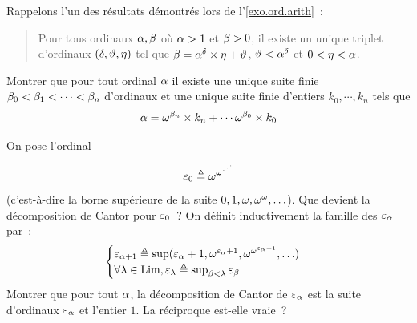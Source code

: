 \begin{exercise}
  Rappelons l'un des résultats démontrés lors de l'\cref{exo.ord.arith}~:
  \begin{quotation}
    \noindent
    Pour tous ordinaux $\alpha,\beta$ où $\alpha > 1$ et $\beta > 0$, il
    existe un unique triplet d'ordinaux $(\delta,\vartheta,\eta)$ tel que
    $\beta = \alpha^{\delta}\times\eta + \vartheta$, $\vartheta < \alpha^{\delta}$
    et $0 < \eta < \alpha$.
  \end{quotation}
  Montrer que pour tout ordinal $\alpha$ il existe une unique suite finie
  $\beta_0 < \beta_1 < \cdots < \beta_n$ d'ordinaux et une unique suite
  finie d'entiers $k_0, \cdots, k_n$ tels que
  \[\alpha = \omega^{\beta_n} \times k_n + \cdots \omega^{\beta_0} \times k_0\]

  On pose l'ordinal
  \[\varepsilon_{0} \triangleq \omega^{\omega^{\iddots}}\]
  (c'est-à-dire la borne supérieure de la suite $0,1,\omega,\omega^\omega,\ldots$). Que
  devient la décomposition de Cantor pour $\varepsilon_{0}$~? On définit inductivement la
  famille des $\varepsilon_{\alpha}$ par~:
  \[\begin{cases}
  \varepsilon_{\alpha+1} \triangleq \sup(\varepsilon_{\alpha} + 1, \omega^{\varepsilon_{\alpha} + 1},
  \omega^{\omega^{\varepsilon_{\alpha} + 1}},\ldots)\\
  \forall \lambda \in \operatorname{Lim}, \varepsilon_{\lambda} \triangleq \sup_{\beta < \lambda} \varepsilon_{\beta}
  \end{cases}\]
  Montrer que pour tout $\alpha$, la décomposition de Cantor de $\varepsilon_{\alpha}$
  est la suite d'ordinaux $\varepsilon_{\alpha}$ et l'entier $1$. La réciproque est-elle
  vraie~?
\end{exercise}

